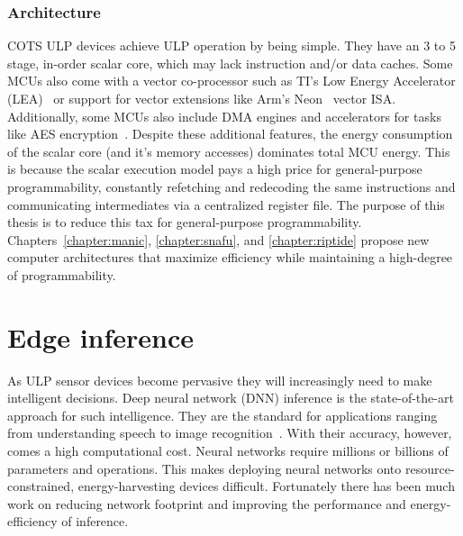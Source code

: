 \subsubsection{Architecture}
COTS ULP devices achieve ULP operation by being simple.
% 
They have an 3 to 5 stage, in-order scalar core, which may lack instruction and/or data caches.
% 
Some MCUs also come with a vector co-processor such as TI's Low Energy Accelerator (LEA)~\cite{lea} or support for vector extensions like Arm's Neon~\cite{neon} vector ISA.
% 
Additionally, some MCUs also include DMA engines and accelerators for tasks like AES encryption~\cite{msp430fr5994}.
% 
Despite these additional features, the energy consumption of the scalar core (and it's memory accesses) dominates total MCU energy.
% 
This is because the scalar execution model pays a high price for general-purpose programmability, constantly refetching and redecoding the same instructions and communicating intermediates via a centralized register file.
% 
The purpose of this thesis is to reduce this tax for general-purpose programmability.
% 
Chapters~\autoref{chapter:manic}, \autoref{chapter:snafu}, and \autoref{chapter:riptide} propose new computer architectures that maximize efficiency while maintaining a high-degree of programmability.

\section{Edge inference}
As ULP sensor devices become pervasive they will increasingly need to make intelligent decisions.
% 
Deep neural network (DNN) inference is the state-of-the-art approach for such intelligence.
% 
They are the standard for applications ranging from understanding speech to image recognition~\cite{alexnet,vgg, googlenet}.
% 
With their accuracy, however, comes a high computational cost.
% 
Neural networks require millions or billions of parameters and operations.
% 
This makes deploying neural networks onto resource-constrained, energy-harvesting devices difficult.
% 
Fortunately there has been much work on reducing network footprint and improving the performance and energy-efficiency of inference.
% 

